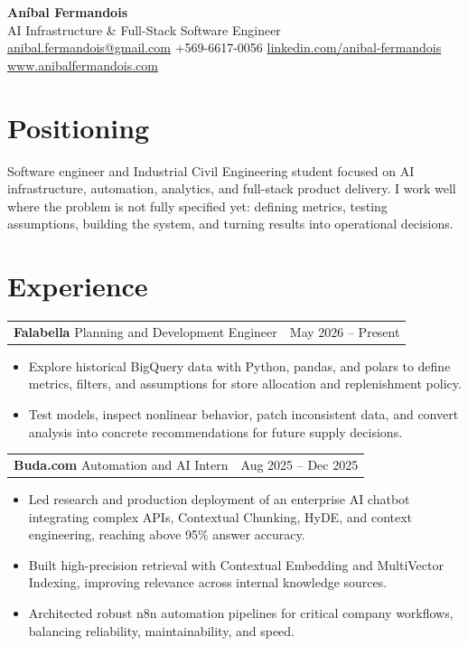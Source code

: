 \documentclass[10pt,letterpaper]{article}
\makeatletter
\newcommand{\role}[4]{%
  \begin{tabularx}{\linewidth}{@{}Xr@{}}
    \textbf{#1} \hspace{3pt} {\color{accent}#2} & {\color{muted}#3} \\
  \end{tabularx}
  #4
}
\makeatother
\begin{document}
\color{ink}

{\fontsize{26}{28}\selectfont\bfseries Aníbal Fermandois}\\
{\large AI Infrastructure \& Full-Stack Software Engineer}\\
\vspace{3pt}
\href{mailto:anibal.fermandois@gmail.com}{anibal.fermandois@gmail.com} \quad
+569-6617-0056 \quad
\href{https://www.linkedin.com/in/anibal-fermandois-224ab4262/}{linkedin.com/anibal-fermandois} \quad
\href{https://www.anibalfermandois.com/}{www.anibalfermandois.com}

\section{Positioning}
Software engineer and Industrial Civil Engineering student focused on AI infrastructure, automation, analytics, and full-stack product delivery. I work well where the problem is not fully specified yet: defining metrics, testing assumptions, building the system, and turning results into operational decisions.

\section{Experience}
\role{Falabella}{Planning and Development Engineer}{May 2026 -- Present}{
\begin{itemize}
  \item Explore historical BigQuery data with Python, pandas, and polars to define metrics, filters, and assumptions for store allocation and replenishment policy.
  \item Test models, inspect nonlinear behavior, patch inconsistent data, and convert analysis into concrete recommendations for future supply decisions.
\end{itemize}}

\role{Buda.com}{Automation and AI Intern}{Aug 2025 -- Dec 2025}{
\begin{itemize}
  \item Led research and production deployment of an enterprise AI chatbot integrating complex APIs, Contextual Chunking, HyDE, and context engineering, reaching above 95\% answer accuracy.
  \item Built high-precision retrieval with Contextual Embedding and MultiVector Indexing, improving relevance across internal knowledge sources.
  \item Architected robust n8n automation pipelines for critical company workflows, balancing reliability, maintainability, and speed.
\end{itemize}}
\end{document}

